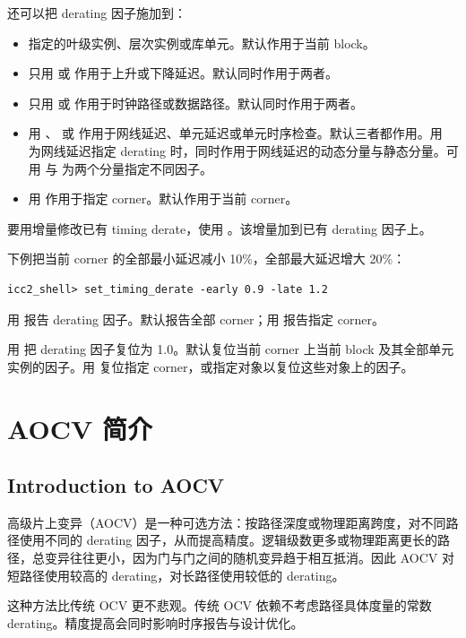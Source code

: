 还可以把 derating 因子施加到：
\begin{itemize}
  \item 指定的叶级实例、层次实例或库单元。默认作用于当前 block。
  \item 只用  或  作用于上升或下降延迟。默认同时作用于两者。
  \item 只用  或  作用于时钟路径或数据路径。默认同时作用于两者。
  \item 用 、 或  作用于网线延迟、单元延迟或单元时序检查。默认三者都作用。用  为网线延迟指定 derating 时，同时作用于网线延迟的动态分量与静态分量。可用  与  为两个分量指定不同因子。
  \item 用  作用于指定 corner。默认作用于当前 corner。
\end{itemize}

要用增量修改已有 timing derate，使用 。该增量加到已有 derating 因子上。

下例把当前 corner 的全部最小延迟减小 10\%，全部最大延迟增大 20\%：
\begin{lstlisting}
icc2_shell> set_timing_derate -early 0.9 -late 1.2
\end{lstlisting}

用  报告 derating 因子。默认报告全部 corner；用  报告指定 corner。

用  把 derating 因子复位为 1.0。默认复位当前 corner 上当前 block 及其全部单元实例的因子。用  复位指定 corner，或指定对象以复位这些对象上的因子。

\section{AOCV 简介}
\subsection*{Introduction to AOCV}

高级片上变异（AOCV）是一种可选方法：按路径深度或物理距离跨度，对不同路径使用不同的 derating 因子，从而提高精度。逻辑级数更多或物理距离更长的路径，总变异往往更小，因为门与门之间的随机变异趋于相互抵消。因此 AOCV 对短路径使用较高的 derating，对长路径使用较低的 derating。

这种方法比传统 OCV 更不悲观。传统 OCV 依赖不考虑路径具体度量的常数 derating。精度提高会同时影响时序报告与设计优化。

